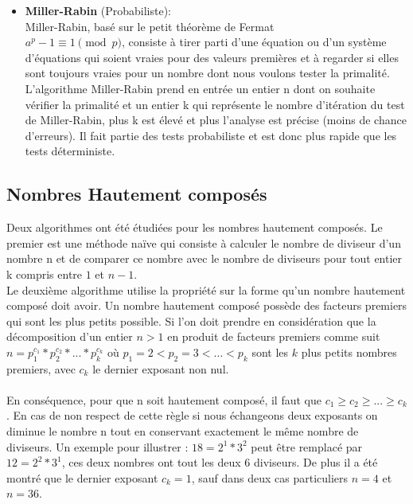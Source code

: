 \begin{itemize}
			\item \textbf{Miller-Rabin} (Probabiliste):\\
			Miller-Rabin, basé sur le petit théorème de Fermat \\ $a^p-1 \equiv 1 \pmod p$, consiste à tirer parti d'une équation ou d'un système d'équations qui soient vraies pour des valeurs premières et à regarder si elles sont toujours vraies pour un nombre dont nous voulons tester la primalité. L'algorithme Miller-Rabin prend en entrée un entier n dont on souhaite vérifier la primalité et un entier k qui représente le nombre d’itération du test de Miller-Rabin, plus k est élevé et plus l’analyse est précise (moins de chance d’erreurs). Il fait partie des tests probabiliste et est donc plus rapide que les tests déterministe.\\
		\end{itemize}
		
		\subsection{Nombres Hautement composés}
		Deux algorithmes ont été étudiées pour les nombres hautement composés. 
		Le premier est une méthode naïve qui consiste à calculer le nombre de diviseur d'un nombre n et de comparer ce nombre avec le nombre de diviseurs pour tout entier k compris entre $1$ et $n-1$.\\
		Le deuxième algorithme utilise la propriété sur la forme qu'un nombre hautement composé doit avoir. Un nombre hautement composé possède des facteurs premiers qui sont les plus petits possible. Si l'on doit prendre en considération que la décomposition d'un entier $n > 1$ en produit de facteurs premiers comme suit  $n = p_1^{c_1} * p_2^{c_2} * ... * p_k^{c_k}$ où $p_1 = 2 < p_2 = 3 < … < p_k$ sont les $k$ plus petits nombres premiers, avec $c_k$ le dernier exposant non nul.
		\paragraph{}En conséquence, pour que n soit hautement composé, il faut que $c_1 \ge c_2 \ge ... \ge c_k$. En cas de non respect de cette règle si nous échangeons deux exposants on diminue le nombre n tout en conservant exactement le même nombre de diviseurs. Un exemple pour illustrer : $18 = 2^1 * 3^2$ peut être remplacé par $12 = 2^2 * 3^1$, ces deux nombres ont tout les deux 6 diviseurs. De plus il a été montré que le dernier exposant $c_k = 1$, sauf dans deux cas particuliers $n = 4$ et $n = 36$.

